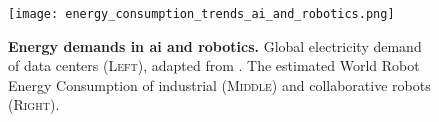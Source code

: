 
\begin{figure}[t!]
	\centering
	\hspace*{\fill}
	\texttt{[image: energy\_consumption\_trends\_ai\_and\_robotics.png]}
	\hspace*{\fill}
	\caption[] {\label{fig:energy_consumption_trends_ai_and_robotics} \textbf{Energy demands in \ac{ai} and robotics.} Global electricity demand of data centers (\textsc{Left}), adapted from \cite{andrae2015global}. The estimated World Robot Energy Consumption of industrial (\textsc{Middle}) and  collaborative robots (\textsc{Right}).}
\end{figure}



